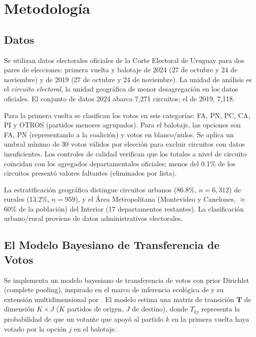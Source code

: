 
\section{Metodología}
\label{sec:metodologia}

\subsection{Datos}

Se utilizan datos electorales oficiales de la Corte Electoral de Uruguay para dos pares de elecciones: primera vuelta y balotaje de 2024 (27 de octubre y 24 de noviembre) y de 2019 (27 de octubre y 24 de noviembre). La unidad de análisis es el \textit{circuito electoral}, la unidad geográfica de menor desagregación en los datos oficiales. El conjunto de datos 2024 abarca 7{,}271 circuitos; el de 2019, 7{,}118.

Para la primera vuelta se clasifican los votos en seis categorías: FA, PN, PC, CA, PI y OTROS (partidos menores agrupados). Para el balotaje, las opciones son FA, PN (representando a la coalición) y votos en blanco/nulos. Se aplica un umbral mínimo de 30 votos válidos por elección para excluir circuitos con datos insuficientes. Los controles de calidad verifican que los totales a nivel de circuito coincidan con los agregados departamentales oficiales; menos del 0.1\% de los circuitos presentó valores faltantes (eliminados por lista).

La estratificación geográfica distingue circuitos urbanos (86.8\%, $n=6{,}312$) de rurales (13.2\%, $n=959$), y el Área Metropolitana (Montevideo y Canelones, $\approx$60\% de la población) del Interior (17 departamentos restantes). La clasificación urbano/rural proviene de datos administrativos electorales.

\subsection{El Modelo Bayesiano de Transferencia de Votos}

Se implementa un modelo bayesiano de transferencia de votos con prior Dirichlet (complete pooling), inspirado en el marco de inferencia ecológica de \citet{king1997} y su extensión multidimensional por \citet{rosen2001bayesian}. El modelo estima una matriz de transición $\mathbf{T}$ de dimensión $K \times J$ ($K$ partidos de origen, $J$ de destino), donde $T_{kj}$ representa la probabilidad de que un votante que apoyó al partido $k$ en la primera vuelta haya votado por la opción $j$ en el balotaje.


